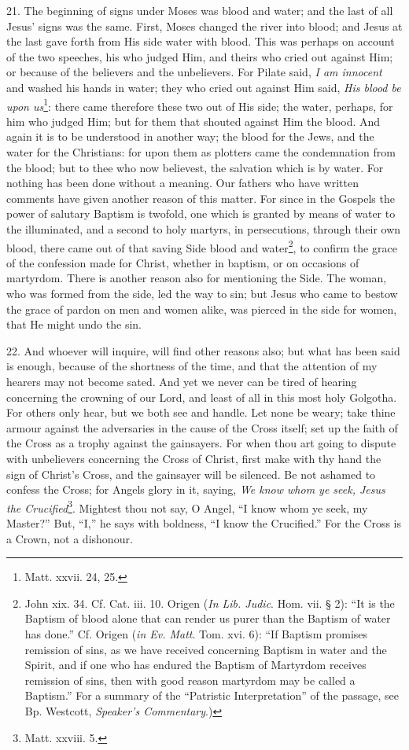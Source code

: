 21. The beginning of signs under Moses was blood and water; and the last of all Jesus’ signs was the same. First, Moses changed the river into blood; and Jesus at the last gave forth from His side water with blood. This was perhaps on account of the two speeches, his who judged Him, and theirs who cried out against Him; or because of the believers and the unbelievers. For Pilate said, \emph{I am innocent} and washed his hands in water; they who cried out against Him said, \emph{His blood be upon us}\footnote{Matt. xxvii. 24, 25.}: there came therefore these two out of His side; the water, perhaps, for him who judged Him; but for them that shouted against Him the blood. And again it is to be understood in another way; the blood for the Jews, and the water for the Christians: for upon them as plotters came the condemnation from the blood; but to thee who now believest, the salvation which is by water. For nothing has been done without a meaning. Our fathers who have written comments have given another reason of this matter. For since in the Gospels the power of salutary Baptism is twofold, one which is granted by means of water to the illuminated, and a second to holy martyrs, in persecutions, through their own blood, there came out of that saving Side blood and water\footnote{John xix. 34. Cf. Cat. iii. 10. Origen (\emph{In Lib. Judic}. Hom. vii. § 2): “It is the Baptism of blood alone that can render us purer than the Baptism of water has done.” Cf. Origen (\emph{in Ev. Matt}. Tom. xvi. 6): “If Baptism promises remission of sins, as we have received concerning Baptism in water and the Spirit, and if one who has endured the Baptism of Martyrdom receives remission of sins, then with good reason martyrdom may be called a Baptism.” For a summary of the “Patristic Interpretation” of the passage, see Bp. Westcott, \emph{Speaker’s Commentary}.)}, to confirm the grace of the confession made for Christ, whether in baptism, or on occasions of martyrdom. There is another reason also for mentioning the Side. The woman, who was formed from the side, led the way to sin; but Jesus who came to bestow the grace of pardon on men and women alike, was pierced in the side for women, that He might undo the sin.

22. And whoever will inquire, will find other reasons also; but what has been said is enough, because of the shortness of the time, and that the attention of my hearers may not become sated. And yet we never can be tired of hearing concerning the crowning of our Lord, and least of all in this most holy Golgotha. For others only hear, but we both see and handle. Let none be weary; take thine armour against the adversaries in the cause of the Cross itself; set up the faith of the Cross as a trophy against the gainsayers. For when thou art going to dispute with unbelievers concerning the Cross of Christ, first make with thy hand the sign of Christ’s Cross, and the gainsayer will be silenced. Be not ashamed to confess the Cross; for Angels glory in it, saying, \emph{We know whom ye seek, Jesus the Crucified}\footnote{Matt. xxviii. 5.}. Mightest thou not say, O Angel, “I know whom ye seek, my Master?” But, “I,” he says with boldness, “I know the Crucified.” For the Cross is a Crown, not a dishonour.

